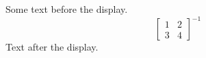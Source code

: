 \documentclass[12pt]{article}
\begin{document}
Some text before the display.
\[ \left[ \begin{array}{cc} 1 & 2 \\ 3 & 4 \end{array} \right]^{-1} \]
Text after the display.
\end{document}
